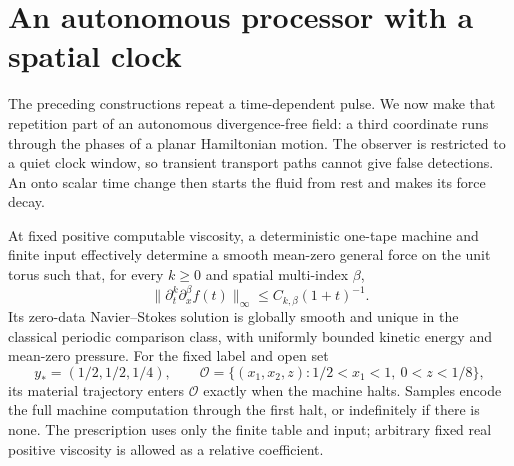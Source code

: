 \section{An autonomous processor with a spatial clock}
\label{sec:sa-autonomous}
The preceding constructions repeat a time-dependent pulse.  We now make
that repetition part of an autonomous divergence-free field: a third
coordinate runs through the phases of a planar Hamiltonian motion.
The observer is restricted to a quiet clock window, so transient transport
paths cannot give false detections.  An onto scalar time change then starts
the fluid from rest and makes its force decay.

\begin{theorem}\label{thm:sa-autonomous}
At fixed positive computable viscosity, a deterministic one-tape machine
and finite input effectively determine a smooth mean-zero general force
on the unit torus such that, for every $k\ge0$ and spatial multi-index
$\beta$,
\begin{equation}\label{eq:sa-autonomous-force-class}
 \|\partial_t^k\partial_x^\beta f(t)\|_\infty
       \le C_{k,\beta}(1+t)^{-1}.
\end{equation}
Its zero-data Navier--Stokes solution is globally smooth and unique in
the classical periodic comparison class, with uniformly bounded kinetic
energy and mean-zero pressure.  For the fixed label and open set
\begin{equation}\label{eq:sa-autonomous-event}
 y_*=(1/2,1/2,1/4),\qquad
 \mathcal O=\{(x_1,x_2,z):1/2<x_1<1,\ 0<z<1/8\},
\end{equation}
its material trajectory enters $\mathcal O$ exactly when the machine
halts.  Samples encode the full machine computation through the first
halt, or indefinitely if there is none.  The prescription uses only the
finite table and input; arbitrary fixed real positive viscosity is allowed
as a relative coefficient.
\end{theorem}

